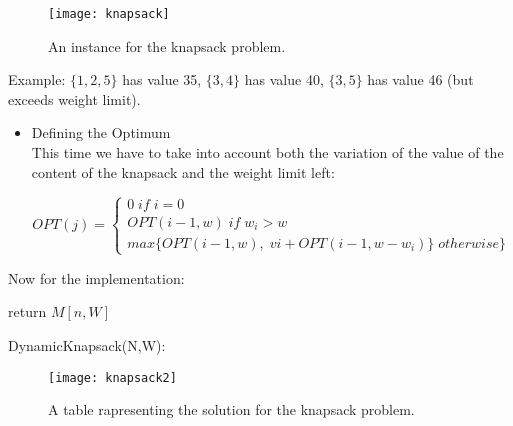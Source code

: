 \begin{figure}[H]
    \centering
    \texttt{[image: knapsack]}
    \caption{An instance for the knapsack problem.}
\end{figure}

Example: $\{ 1, 2, 5 \}$ has value 35,  $\{ 3, 4 \}$ has value 40, $\{ 3, 5 \}$ has value 46 (but exceeds weight limit).

\begin{itemize}

    \item {Defining the Optimum}\\

          This time we have to take into account both the variation of the value of the content of the knapsack and the weight limit left:

          \[OPT(j) = \begin{cases} 0 \; if \; i = 0 \\ OPT(i-1,w) \; if \; w_{i} > w \\ max\{OPT(i−1,w),\; vi + OPT(i−1,w−w_{i})\} \; otherwise \}  \end{cases}\]

\end{itemize}

Now for the implementation:

\begin{algorithm}[H]
    \SetAlgoLined
    \small
    \BlankLine

    \BlankLine



    \BlankLine
    return $M[n,W]$

    \caption{DynamicKnapsack(N,W):}
\end{algorithm}

\begin{figure}[H]
    \centering
    \texttt{[image: knapsack2]}
    \caption{A table rapresenting the solution for the knapsack problem.}
\end{figure}


